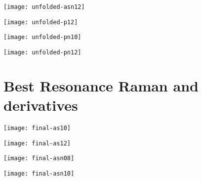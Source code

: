 \newpage

\begin{figure*}[h]
    \texttt{[image: unfolded-asn12]}
    \caption[RR spectra of AsN12-STX]{RR spectra of AsN12-STX. All of the lasers were considered equivalent in terms of amplifications, except for \SI{476}{\nano\metre}, which did not amplify mode 195}
\end{figure*}
\begin{figure*}[h]
    \texttt{[image: unfolded-p12]}
    \caption[RR spectra of P12-STX]{RR spectra of P12-STX. Selected $\lambda$: \SI{369}{\nano\metre}, \SI{447}{\nano\metre}}
\end{figure*}
\begin{figure*}[h]
    \texttt{[image: unfolded-pn10]}
    \caption[RR spectra of PN10-STX]{RR spectra of PN10-STX. Selected $\lambda$: \SI{381}{\nano\metre}, \SI{525}{\nano\metre}}
\end{figure*}
\begin{figure*}[h]
    \texttt{[image: unfolded-pn12]}
    \caption[RR spectra of PN12-STX]{RR spectra of PN12-STX. All of the wavelengths were considered suitable}
\end{figure*}


\newpage
\section{Best Resonance Raman and derivatives}

\begin{figure*}[h]
    \texttt{[image: final-as10]}
    \caption[RR spectra of As10-STX at \SI{381}{\nano\metre}]{RR spectra of As10-STX at \SI{381}{\nano\metre}}
\end{figure*}
\begin{figure*}[h]
    \texttt{[image: final-as12]}
    \caption[RR spectra of As12-STX at \SI{543}{\nano\metre}]{RR spectra of As12-STX at \SI{543}{\nano\metre}}
\end{figure*}
\begin{figure*}[h]
    \texttt{[image: final-asn08]}
    \caption[RR spectra of AsN08-STX at \SI{498}{\nano\metre}]{RR spectra of AsN08-STX at \SI{498}{\nano\metre}}
\end{figure*}
\begin{figure*}[h]
    \texttt{[image: final-asn10]}
    \caption[RR spectra of AsN10-STX at \SI{618}{\nano\metre}]{RR spectra of AsN10-STX at \SI{618}{\nano\metre}}
\end{figure*}

